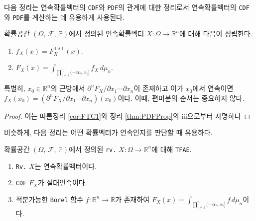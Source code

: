 다음 정리는 연속확률벡터의 \texttt{CDF}와 \texttt{PDF}의 관계에 대한 정리로서 연속확률벡터의 \texttt{CDF}와 \texttt{PDF}를 계산하는 데 유용하게 사용된다.

\begin{theorem}\label{thm:CDFPDFRel}
    확률공간 $(\Omega,\,\mathcal{F},\,\mathbb{P})$에서 정의된 연속확률벡터 $X:\Omega\to\mathbb{R}^n$에 대해 다음이 성립한다.
    \begin{enumerate}
        \item $f_X(x)=F_X^{(s)}(x)$.
        \item $F_X(x)=\int_{\prod_{i=1}^n(-\infty,\,x_i]}f_X\,d\mu_n$.
    \end{enumerate}
    특별히, $x_0\in\mathbb{R}^n$의 근방에서 $\partial^nF_X/\partial x_1\cdots\partial x_n$이 존재하고 이가 $x_0$에서 연속이면 $f_X(x_0)=(\partial^nF_X/\partial x_1\cdots\partial x_n)(x_0)$이다. 이때, 편미분의 순서는 중요하지 않다.
\end{theorem}

\begin{proof}
    이는 따름정리 \ref{cor:FTC1}와 정리 \ref{thm:PDFProp}의 iii으로부터 자명하다
\end{proof}

비슷하게, 다음 정리는 어떤 확률벡터가 연속인지를 판단할 때 유용하다.

\begin{theorem}\label{thm:rvContinuous}
    확률공간 $(\Omega,\,\mathcal{F},\,\mathbb{P})$에서 정의된 \texttt{rv.} $X:\Omega\to\mathbb{R}^n$에 대해 \texttt{TFAE}.
    \begin{enumerate}
        \item \texttt{Rv.} $X$는 연속확률벡터이다.
        \item \texttt{CDF} $F_X$가 절대연속이다.
        \item 적분가능한 \texttt{Borel} 함수 $f:\mathbb{R}^n\to\overline{\mathbb{R}}$가 존재하여 $F_X(x)=\int_{\prod_{i=1}^n(-\infty,\,x_i]}f\,d\mu_n$이다.
    \end{enumerate}
\end{theorem}

